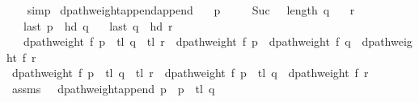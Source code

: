 \begin{isabellebody}
\ \ \isamarkupfalse%
\ simp%
\endisatagproof
{\isafoldproof}%
%
\isadelimproof
\isanewline
%
\endisadelimproof
%
\isadeliminvisible
\isanewline
%
\endisadeliminvisible
%
\isataginvisible
{}\isamarkupfalse%
\ dpath{\isacharunderscore}{\kern0pt}weight{\isacharunderscore}{\kern0pt}append{\isacharunderscore}{\kern0pt}append{\isacharcolon}{\kern0pt}\isanewline
\ \ \ {\isachardoublequoteopen}p\ {\isasymnoteq}\ {\isacharbrackleft}{\kern0pt}{\isacharbrackright}{\kern0pt}{\isachardoublequoteclose}\isanewline
\ \ \ {\isachardoublequoteopen}Suc\ {}\ {\isacharless}{\kern0pt}\ length\ q{\isachardoublequoteclose}\isanewline
\ \ \ {\isachardoublequoteopen}r\ {\isasymnoteq}\ {\isacharbrackleft}{\kern0pt}{\isacharbrackright}{\kern0pt}{\isachardoublequoteclose}\isanewline
\ \ \ {\isachardoublequoteopen}last\ p\ {\isacharequal}{\kern0pt}\ hd\ q{\isachardoublequoteclose}\isanewline
\ \ \ {\isachardoublequoteopen}last\ q\ {\isacharequal}{\kern0pt}\ hd\ r{\isachardoublequoteclose}\isanewline
\ \ \ {\isachardoublequoteopen}dpath{\isacharunderscore}{\kern0pt}weight\ f\ {\isacharparenleft}{\kern0pt}p\ {\isacharat}{\kern0pt}\ tl\ q\ {\isacharat}{\kern0pt}\ tl\ r{\isacharparenright}{\kern0pt}\ {\isacharequal}{\kern0pt}\ dpath{\isacharunderscore}{\kern0pt}weight\ f\ p\ {\isacharplus}{\kern0pt}\ dpath{\isacharunderscore}{\kern0pt}weight\ f\ q\ {\isacharplus}{\kern0pt}\ dpath{\isacharunderscore}{\kern0pt}weight\ f\ r{\isachardoublequoteclose}%
\endisataginvisible
{\isafoldinvisible}%
%
\isadeliminvisible
\isanewline
%
\endisadeliminvisible
%
\isadelimproof
%
\endisadelimproof
%
\isatagproof
{}\isamarkupfalse%
\ {\isacharminus}{\kern0pt}\isanewline
\ \ \isamarkupfalse%
\ {\isachardoublequoteopen}dpath{\isacharunderscore}{\kern0pt}weight\ f\ {\isacharparenleft}{\kern0pt}p\ {\isacharat}{\kern0pt}\ tl\ q\ {\isacharat}{\kern0pt}\ tl\ r{\isacharparenright}{\kern0pt}\ {\isacharequal}{\kern0pt}\ dpath{\isacharunderscore}{\kern0pt}weight\ f\ {\isacharparenleft}{\kern0pt}p\ {\isacharat}{\kern0pt}\ tl\ q{\isacharparenright}{\kern0pt}\ {\isacharplus}{\kern0pt}\ dpath{\isacharunderscore}{\kern0pt}weight\ f\ r{\isachardoublequoteclose}\isanewline
\ \ \ \ \isamarkupfalse%
\ assms{\isacharparenleft}{\kern0pt}{}{\isacharcomma}{\kern0pt}\ {}{\isacharcomma}{\kern0pt}\ {}{\isacharparenright}{\kern0pt}\ dpath{\isacharunderscore}{\kern0pt}weight{\isacharunderscore}{\kern0pt}append{\isacharbrackleft}{\kern0pt}\ {\isacharquery}{\kern0pt}p\ {\isacharequal}{\kern0pt}\ {\isachardoublequoteopen}p\ {\isacharat}{\kern0pt}\ tl\ q{\isachardoublequoteclose}{\isacharbrackright}{\kern0pt}\isanewline

\end{isabellebody}
